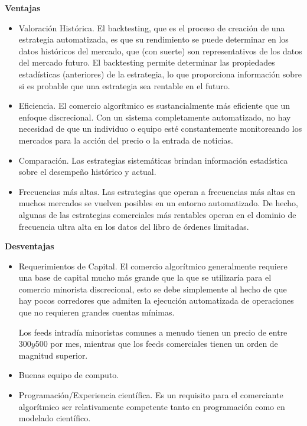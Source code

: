 \documentclass{article}
\begin{document}
\textbf{Ventajas}
\begin{itemize}
\item Valoración Histórica.
El backtesting, que es el proceso de creación de una estrategia automatizada, es que su rendimiento se puede determinar en los datos históricos del mercado, que (con suerte) son representativos de los datos del mercado futuro. El backtesting permite determinar las propiedades estadísticas (anteriores) de la estrategia, lo que proporciona información sobre si es probable que una estrategia sea rentable en el futuro.

\item Eficiencia.
El comercio algorítmico es sustancialmente más eficiente que un enfoque discrecional. Con un sistema completamente automatizado, no hay necesidad de que un individuo o equipo esté constantemente monitoreando los mercados para la acción del precio o la entrada de noticias.
 
\item Comparación.
Las estrategias sistemáticas brindan información estadística sobre el desempeño histórico y actual.

\item Frecuencias más altas.
Las estrategias que operan a frecuencias más altas en muchos mercados se vuelven posibles en un entorno automatizado. De hecho, algunas de las estrategias comerciales más rentables operan en el dominio de frecuencia ultra alta en los datos del libro de órdenes limitadas.

\end{itemize}
 

\textbf{Desventajas}
\begin{itemize}

\item Requerimientos de Capital. El comercio algorítmico generalmente requiere una base de capital mucho más grande que la que se utilizaría para el comercio minorista discrecional, esto se debe simplemente al hecho de que hay pocos corredores que admiten la ejecución automatizada de operaciones que no requieren grandes cuentas mínimas.

Los feeds intradía minoristas comunes a menudo tienen un precio de entre $300 y $500 por mes, mientras que los feeds comerciales tienen un orden de magnitud superior.

\item Buenas equipo de computo.

\item Programación/Experiencia científica.
Es un requisito para el comerciante algorítmico ser relativamente competente tanto en programación como en modelado científico.\cite{halls-moore}

\end{itemize}
\end{document}
